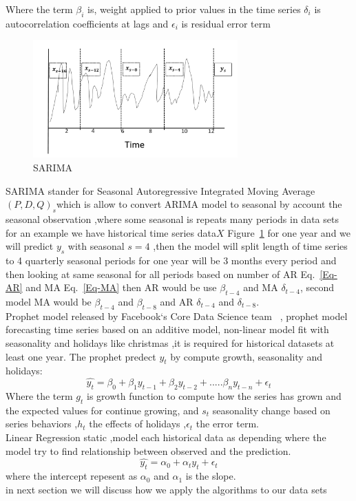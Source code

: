 \documentclass[graybox]{svmult}
\begin{document}
Where the term \(\beta_i \) is, weight applied to prior values in the time series \(\delta_i \) is autocorrelation coefficients at lags and \(\epsilon_i \) is residual error term\\
\begin{figure}
\centering\includegraphics[width=0.7\textwidth]{figures/sarima.png}\caption{SARIMA}\label{fig:sarima}
\end{figure}
SARIMA stander for Seasonal Autoregressive Integrated Moving Average\((P,D,Q)_s\)which is allow to convert ARIMA model to seasonal by account the seasonal observation ,where some seasonal  is repeats many periods in data sets for an example we have historical time series data\(X\) Figure~\ref{fig:sarima} for one year and we will predict \(y_s\)  with seasonal  \(s= 4\) ,then the model will split length  of time series  to 4 quarterly seasonal periods for one year will be 3 months every period and then looking at same seasonal for all periods based on number of AR Eq.~\ref{Eq-AR} and MA Eq.~\ref{Eq-MA} then AR would be use \(\beta_{t-4}\) and MA  \(\delta_{t-4}\), second model MA would be  \(\beta_{t-4}\)  and \(\beta_{t-8}\) and AR \(\delta_{t-4}\) and \(\delta_{t-8}\).\\
Prophet model released by Facebook`s Core Data Science team ~\cite{prophet}, prophet model forecasting time series based on an additive model, non-linear model fit with seasonality and holidays like christmas ,it is required for historical datasets at least one year.
The prophet predect \(y_t\) by compute growth, seasonality and holidays:
\begin{equation}
\hat{y_t} = \beta_0 +\beta_1 y_{t-1}+ \beta_2 y_{t-2}+.....\beta_n y_{t-n}+\epsilon_t
\label{Eq-prophet}
\end{equation}
Where the term \(g_t\) is growth function to compute how the series has grown and the expected values for continue growing, and \(s_t\) seasonality change based on series behaviors ,\(h_t\) the effects of holidays ,\(\epsilon_t\) the error term.\\
Linear Regression static ,model each historical data as depending where the model try to find relationship between observed and the prediction.
\begin{equation}
\hat{y_t} = \alpha_0 + \alpha_t y_t +\epsilon_t
\label{Eq-LR}
\end{equation}
where the intercept repesent as \(\alpha_0\) and \(\alpha_1 \) is the slope.\\
in next section we will discuss how we apply the algorithms to our data sets
\end{document}

